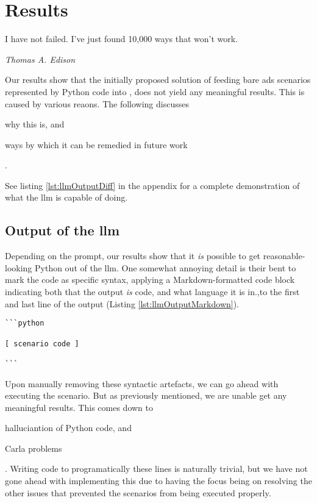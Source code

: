 \chapter{Results}\label{sec:results}

\epigraph{I have not failed. I've just found 10,000 ways that won't work.}{\textit{Thomas A. Edison}}

Our results show that the initially proposed solution of feeding bare
\acrshort{ads} scenarios represented by Python code into , does
not yield any meaningful results. This is caused by various reaons. The
following discusses \begin{inparaenum}
    \item why this is, and 
    \item ways by which it can be remedied in future work \end{inparaenum}.

See listing \ref{lst:llmOutputDiff} in the  appendix for a complete
demonstration of what the \acrlong{llm} is capable of doing. 

\section{Output of the \acrshort{llm}}

Depending on the prompt, our results show that it \emph{is} possible to get
reasonable-looking Python out of the \acrshort{llm}. One somewhat annoying
detail is their bent to mark the code as specific syntax, applying a
Markdown-formatted code block indicating both that the output \emph{is} code,
and what language it is in.,to the first and last line of the output (Listing \ref{lst:llmOutputMarkdown}). 
\begin{lstlisting}[caption={\acrshort{llm}-generated Python code with Markdown syntax. The bracketed part on line 3 has been added for demonstration purposes, removing the actual code for brevity.}, label={lst:llmOutputMarkdown}]
```python

[ scenario code ]

```
\end{lstlisting}

Upon manually removing these syntactic artefacts, we can go ahead with executing
the scenario. But as previously mentioned, we are unable get any meaningful
results. This comes down to \begin{inparaenum}
    \item halluciantion of Python code, and 
    \item Carla problems
\end{inparaenum}. 
Writing code to programatically these lines is naturally trivial, but we have
not gone ahead with implementing this due to having the focus being on resolving
the other issues that prevented the scenarios from being executed properly.


